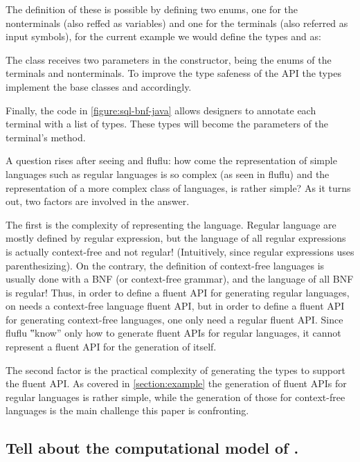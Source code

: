 The definition of these is possible by defining two \Java enums, one for the
nonterminals (also reffed as variables) and one for the terminals (also
referred as input symbols), for the current example we would define the types
 and  as:

\begin{quote}
  \parbox[c]{43ex}{}
\end{quote}

The  class receives two parameters in the constructor, being the enums
of the terminals and nonterminals.
To improve the type safeness of the API the types implement the base classes
 and  accordingly.

Finally, the code in \cref{figure:sql-bnf-java} allows designers to annotate
each terminal with a list of types.
These types will become the parameters of the terminal's method.

A question rises after seeing \Fajita and fluflu: how come the representation
of simple languages such as regular languages is so complex (as seen in fluflu)
and the representation of a more complex class of languages, is rather simple?
As it turns out, two factors are involved in the answer.

The first is the complexity of representing the language.
Regular language are mostly defined by regular expression, but the language of
all regular expressions is actually context-free and not regular!
(Intuitively, since regular expressions uses parenthesizing). On the contrary,
the definition of context-free languages is usually done with a BNF (or
context-free grammar), and the language of all BNF is regular!
Thus, in order to define a fluent API for generating regular languages, on needs a
context-free language fluent API, but in order to define a fluent API for
generating context-free languages, one only need a regular fluent API.
Since fluflu ‟know” only how to generate fluent APIs for regular languages,
it cannot represent a fluent API for the generation of itself.

The second factor is the practical complexity of generating the \Java types to
support the fluent API. As covered in \cref{section:example} the generation of
fluent APIs for regular languages is rather simple, while the generation of
those for context-free languages is the main challenge this paper is
confronting.

\subsection{Tell about the computational model of \CC.}

